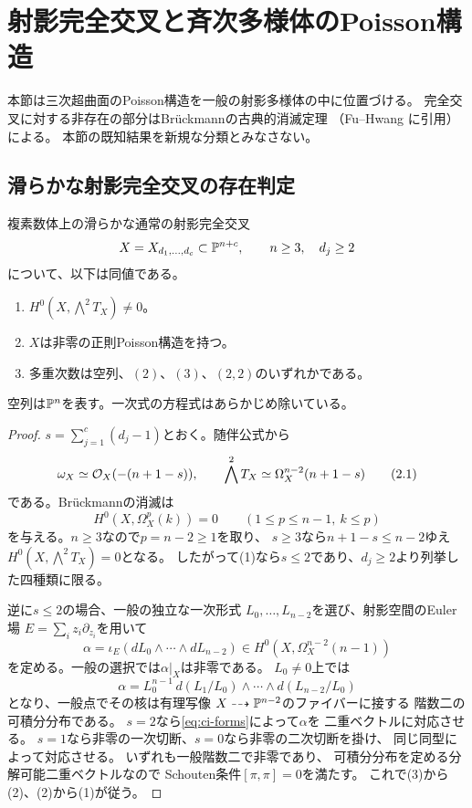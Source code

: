 \section{射影完全交叉と斉次多様体のPoisson構造}
\label{sec:general-poisson-existence}
本節は三次超曲面のPoisson構造を一般の射影多様体の中に位置づける。
完全交叉に対する非存在の部分はBr\"uckmannの古典的消滅定理
（Fu--Hwang \cite[Lemma 4.1]{FuHwangCI} に引用）による。
本節の既知結果を新規な分類とみなさない。

\subsection{滑らかな射影完全交叉の存在判定}
\begin{theorem}\label{thm:ci-poisson-existence}
複素数体上の滑らかな通常の射影完全交叉
\[
 X=X_{d_1,\ldots,d_c}\subset\mathbb P^{n+c},
 \qquad n\ge3,\quad d_j\ge2
\]
について、以下は同値である。
\begin{enumerate}[label=(\arabic*)]
\item $H^0(X,\bigwedge^2T_X)\ne0$。
\item $X$は非零の正則Poisson構造を持つ。
\item 多重次数は空列、$(2)$、$(3)$、$(2,2)$のいずれかである。
\end{enumerate}
空列は$\mathbb P^n$を表す。一次式の方程式はあらかじめ除いている。
\end{theorem}
\begin{proof}
$s=\sum_{j=1}^c(d_j-1)$とおく。随伴公式から
\[
 \omega_X\simeq\mathcal O_X(-(n+1-s)),\qquad
 \bigwedge^2T_X\simeq\Omega_X^{n-2}(n+1-s)
 \tag{2.1}\label{eq:ci-forms}
\]
である。Br\"uckmannの消滅\cite[Lemma 4.1]{FuHwangCI}は
\[
 H^0(X,\Omega_X^p(k))=0
 \qquad(1\le p\le n-1,\ k\le p)
 \tag{2.2}\label{eq:ci-vanishing}
\]
を与える。$n\ge3$なので$p=n-2\ge1$を取り、
$s\ge3$なら$n+1-s\le n-2$ゆえ
$H^0(X,\bigwedge^2T_X)=0$となる。
したがって(1)なら$s\le2$であり、$d_j\ge2$より列挙した四種類に限る。

逆に$s\le2$の場合、一般の独立な一次形式
$L_0,\ldots,L_{n-2}$を選び、射影空間のEuler場
$E=\sum_i z_i\partial_{z_i}$を用いて
\[
 \alpha=\iota_E(dL_0\wedge\cdots\wedge dL_{n-2})
       \in H^0(X,\Omega_X^{n-2}(n-1))
\]
を定める。一般の選択では$\alpha|_X$は非零である。
$L_0\ne0$上では
\[
 \alpha=L_0^{n-1}\,
 d(L_1/L_0)\wedge\cdots\wedge d(L_{n-2}/L_0)
\]
となり、一般点でその核は有理写像
$X\dashrightarrow\mathbb P^{n-2}$のファイバーに接する
階数二の可積分分布である。
$s=2$なら\eqref{eq:ci-forms}によって$\alpha$を
二重ベクトルに対応させる。
$s=1$なら非零の一次切断、$s=0$なら非零の二次切断を掛け、
同じ同型によって対応させる。
いずれも一般階数二で非零であり、
可積分分布を定める分解可能二重ベクトルなので
Schouten条件$[\pi,\pi]=0$を満たす。
これで(3)から(2)、(2)から(1)が従う。
\end{proof}

